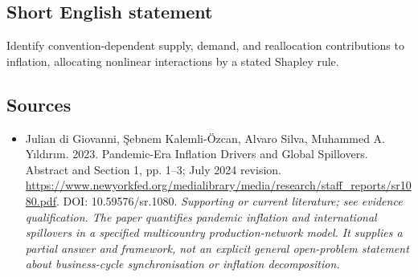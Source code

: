 \documentclass[11pt]{article}
\begin{document}
\subsection{Short English statement}
Identify convention-dependent supply, demand, and reallocation contributions to inflation, allocating nonlinear interactions by a stated Shapley rule.

\subsection{Sources}
\begin{itemize}\raggedright
\item[\textnormal{[S1]}]\hypertarget{source:30007522:1}{} Julian di Giovanni, Şebnem Kalemli-Özcan, Alvaro Silva, Muhammed A. Yıldırım. 2023. Pandemic-Era Inflation Drivers and Global Spillovers. Abstract and Section 1, pp. 1–3; July 2024 revision.
\url{https://www.newyorkfed.org/medialibrary/media/research/staff_reports/sr1080.pdf}.
DOI: 10.59576/sr.1080.
{\small\textit{Supporting or current literature; see evidence qualification. The paper quantifies pandemic inflation and international spillovers in a specified multicountry production-network model. It supplies a partial answer and framework, not an explicit general open-problem statement about business-cycle synchronisation or inflation decomposition.}}
\end{itemize}
\end{document}
